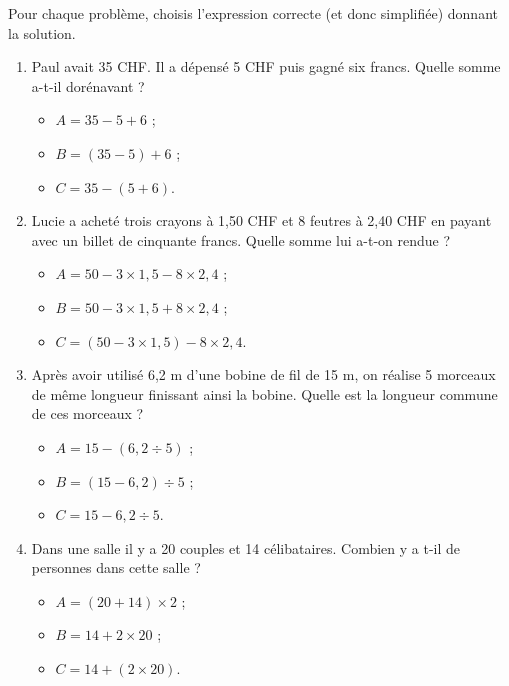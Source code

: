 \begin{exercice}
Pour chaque problème, choisis l'expression correcte (et donc simplifiée) donnant la solution.\\[-1em]
\begin{enumerate}
 \item Paul avait 35 CHF. Il a dépensé 5 CHF puis gagné six francs. Quelle somme a-t-il dorénavant ?
 \begin{itemize}
  \item $A = 35 - 5 + 6$ ;
  \item $B = (35 - 5) + 6$ ;
  \item $C = 35 - (5 + 6)$.
  \end{itemize}
 \item Lucie a acheté trois crayons à 1,50 CHF et 8 feutres à 2,40 CHF en payant avec un billet de cinquante francs. Quelle somme lui a-t-on rendue ?
  \begin{itemize}
  \item $A = 50 - 3 \times 1,5 - 8 \times 2,4$ ;
  \item $B = 50 - 3 \times 1,5 + 8 \times 2,4$ ;
  \item $C = (50 - 3 \times 1,5) - 8 \times 2,4$.
  \end{itemize}
 \item Après avoir utilisé 6,2 m d'une bobine de fil de 15 m, on réalise 5 morceaux de même longueur finissant ainsi la bobine. Quelle est la longueur commune de ces morceaux ?
  \begin{itemize}
   \item $A = 15 - (6,2 \div 5)$ ;
   \item $B = (15 - 6,2) \div 5$ ;
   \item $C = 15 - 6,2 \div 5$.
   \end{itemize}
 \item Dans une salle il y a 20 couples et 14 célibataires. Combien y a t-il de personnes dans cette salle ?
  \begin{itemize}
   \item $A = (20 + 14) \times 2$ ;
   \item $B = 14 + 2 \times 20$ ;
   \item $C = 14 + (2 \times 20)$.
   \end{itemize}
 \end{enumerate}

\end{exercice}


